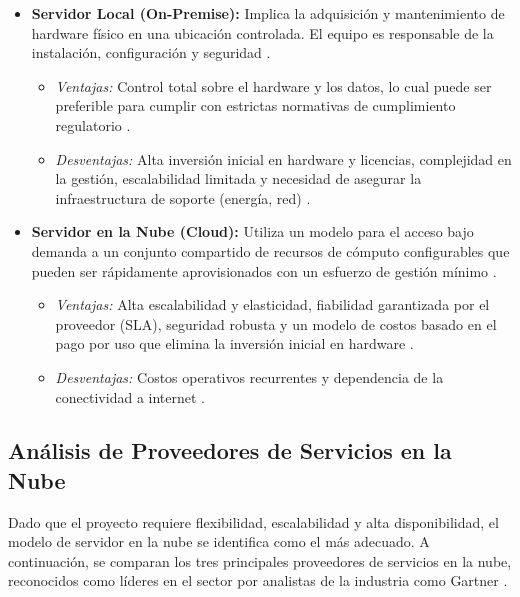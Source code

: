 \begin{itemize}
    \item \textbf{Servidor Local (On-Premise):} Implica la adquisición y mantenimiento de hardware físico en una ubicación controlada. El equipo es responsable de la instalación, configuración y seguridad \cite{nordlayer2024}.
        \begin{itemize}
            \item \textit{Ventajas:} Control total sobre el hardware y los datos, lo cual puede ser preferible para cumplir con estrictas normativas de cumplimiento regulatorio \cite{nordlayer2024}.
            \item \textit{Desventajas:} Alta inversión inicial en hardware y licencias, complejidad en la gestión, escalabilidad limitada y necesidad de asegurar la infraestructura de soporte (energía, red) \cite{softteco2024}.
        \end{itemize}
    \item \textbf{Servidor en la Nube (Cloud):} Utiliza un modelo para el acceso bajo demanda a un conjunto compartido de recursos de cómputo configurables que pueden ser rápidamente aprovisionados con un esfuerzo de gestión mínimo \cite{mell2011nist}.
        \begin{itemize}
            \item \textit{Ventajas:} Alta escalabilidad y elasticidad, fiabilidad garantizada por el proveedor (SLA), seguridad robusta y un modelo de costos basado en el pago por uso que elimina la inversión inicial en hardware \cite{softteco2024}.
            \item \textit{Desventajas:} Costos operativos recurrentes y dependencia de la conectividad a internet \cite{softteco2024}.
        \end{itemize}
\end{itemize}

\subsection*{Análisis de Proveedores de Servicios en la Nube}
\label{subsec:proveedores_nube}

Dado que el proyecto requiere flexibilidad, escalabilidad y alta disponibilidad, el modelo de servidor en la nube se identifica como el más adecuado. A continuación, se comparan los tres principales proveedores de servicios en la nube, reconocidos como líderes en el sector por analistas de la industria como Gartner \cite{gartner2023magic}.


